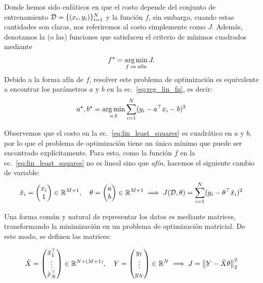 Donde hemos sido enfáticos en que el costo depende del conjunto de entrenamiento ${\mathcal D}=\{(x_i,y_i)\}_{i=1}^N$ y la función $f$, sin embargo, cuando estas cantidades son claras, nos referiremos al costo simplemente como $J$. Además, denotamos la (o las) funciones que satisfacen el criterio de mínimos cuadrados mediante
\begin{equation}
	f^\star = \operatorname*{arg\,min}_{f\text{ es afín}} J.
\end{equation}
Debido a la forma afín de $f$, resolver este problema de optimización es equivalente a encontrar los parámetros $a$ y $b$ en la ec.~\eqref{eq:reg_lin_fn}, es decir: 
\begin{equation}
	a^\star,b^\star = \operatorname*{arg\,min}_{a,b} \sum_{i=1}^N(y_i-a^
	\top x_i - b)^2
	\label{eq:lin_least_squares}
\end{equation}

Observemos que el costo en la  ec.~\eqref{eq:lin_least_squares} es cuadrático en $a$ y $b$, por lo que el problema de optimización tiene un único mínimo que puede ser encontrado explícitamente. Para esto, como la función $f$ en la ec.~\eqref{eq:lin_least_squares} no es lineal sino que \emph{afín}, hacemos el siguiente cambio de variable:
\begin{equation}
  \tilde{x}_i = \left( \begin{matrix}x_i \\  1\end{matrix}\right) \in\mathbb{R}^{M+1},\quad
  \theta = \left( \begin{matrix}a \\  b\end{matrix}\right)\in\mathbb{R}^{M+1} \implies J({\mathcal D},\theta) = \sum_{i=1}^N(y_i-\theta^
	\top \tilde{x}_i)^2
 \label{eq:truco_reg_lin} 
\end{equation}

Una forma común y natural de representar los datos es mediante matrices, transformando la minimización en un problema de optimización matricial. De este modo, se definen las matrices:

\begin{equation}
  \tilde{X} = \left( \begin{matrix}\tilde{x}_1^\top \\\vdots \\ \tilde{x}_N^\top \end{matrix}\right)\in\mathbb{R}^{N\times (M+1)} ,\quad
  Y = \left( \begin{matrix}y_1 \\\vdots \\y_N \end{matrix}\right) \in\mathbb{R}^{N} \implies J = \left\lVert Y-\tilde{X}\theta\right\rVert_2^2
 \label{eq:matrices_X} 
\end{equation}

